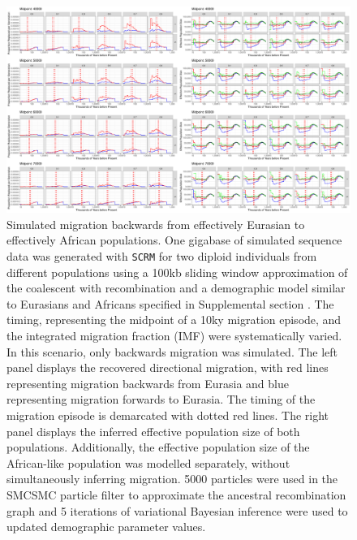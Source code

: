 \begin{figure}
	\centering
	\includegraphics[width=\textwidth]{plot/backward_different_starts.pdf}
	\caption[Simulated migration backwards from effectively Eurasian to effectively African populations]{Simulated migration backwards from effectively Eurasian to effectively African populations. One gigabase of simulated sequence data was generated with {\tt SCRM} for two diploid individuals from different populations using a 100kb sliding window approximation of the coalescent with recombination and a demographic model similar to Eurasians and Africans specified in Supplemental section . The timing, representing the midpoint of a 10ky migration episode, and the integrated migration fraction (IMF) were systematically varied. In this scenario, only backwards migration was simulated. The left panel displays the recovered directional migration, with red lines representing migration backwards from Eurasia and blue representing migration forwards to Eurasia. The timing of the migration episode is demarcated with dotted red lines. The right panel displays the inferred effective population size of both populations. Additionally, the effective population size of the African-like population was modelled separately, without simultaneously inferring migration. 5000 particles were used in the SMCSMC particle filter to approximate the ancestral recombination graph and 5 iterations of variational Bayesian inference were used to updated demographic parameter values.}
	\label{fig:backsim}
\end{figure}

